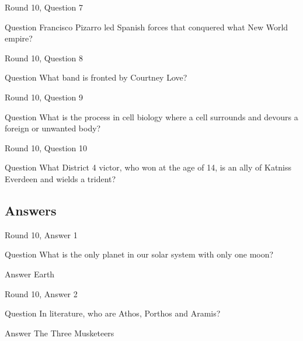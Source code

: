 \documentclass[11pt]{beamer}
\begin{document}
\begin{frame}{Round 10, Question 7}
\begin{block}{Question}
Francisco Pizarro led Spanish forces that conquered what New World empire\@?
\end{block}
\end{frame}
    

\begin{frame}{Round 10, Question 8}
\begin{block}{Question}
What band is fronted by Courtney Love\@?
\end{block}
\end{frame}
    

\begin{frame}{Round 10, Question 9}
\begin{block}{Question}
What is the process in cell biology where a cell surrounds and devours a foreign or unwanted body\@?
\end{block}
\end{frame}
    

\begin{frame}{Round 10, Question 10}
\begin{block}{Question}
What District 4 victor, who won at the age of 14, is an ally of Katniss Everdeen and wields a trident\@?
\end{block}
\end{frame}
    
\subsection{Answers}

\begin{frame}{Round 10, Answer 1}
\begin{block}{Question}
What is the only planet in our solar system with only one moon\@?
\end{block}
\pause{}
\begin{block}{Answer}
Earth
\end{block}
\end{frame}
    

\begin{frame}{Round 10, Answer 2}
\begin{block}{Question}
In literature, who are Athos, Porthos and Aramis\@?
\end{block}
\pause{}
\begin{block}{Answer}
The Three Musketeers
\end{block}
\end{frame}
    
\end{document}
